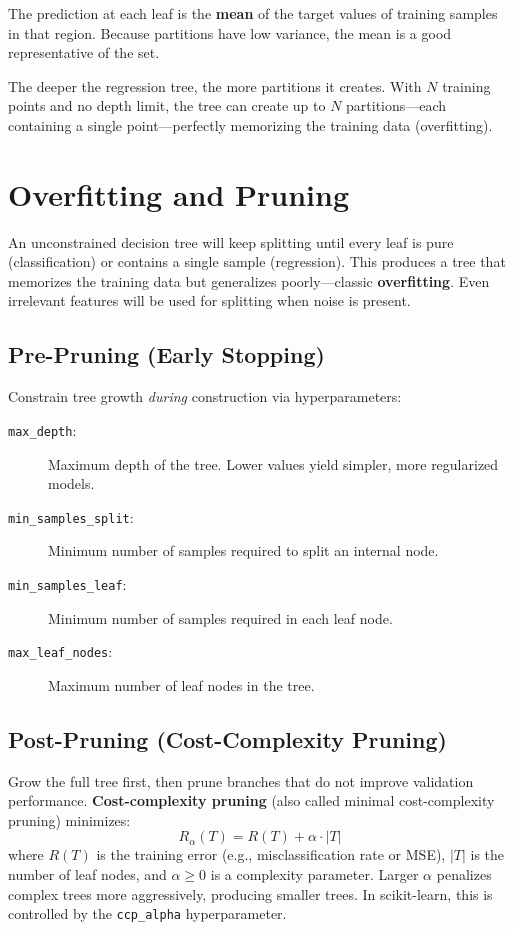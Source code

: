 The prediction at each leaf is the \textbf{mean} of the target values of training samples in that region. Because partitions have low variance, the mean is a good representative of the set.

\begin{remark}
The deeper the regression tree, the more partitions it creates. With $N$ training points and no depth limit, the tree can create up to $N$ partitions---each containing a single point---perfectly memorizing the training data (overfitting).
\end{remark}

\section*{Overfitting and Pruning}

An unconstrained decision tree will keep splitting until every leaf is pure (classification) or contains a single sample (regression). This produces a tree that memorizes the training data but generalizes poorly---classic \textbf{overfitting}. Even irrelevant features will be used for splitting when noise is present.

\subsection*{Pre-Pruning (Early Stopping)}

Constrain tree growth \textit{during} construction via hyperparameters:

\begin{description}
    \item[\texttt{max\_depth}:] Maximum depth of the tree. Lower values yield simpler, more regularized models.
    \item[\texttt{min\_samples\_split}:] Minimum number of samples required to split an internal node.
    \item[\texttt{min\_samples\_leaf}:] Minimum number of samples required in each leaf node.
    \item[\texttt{max\_leaf\_nodes}:] Maximum number of leaf nodes in the tree.
\end{description}

\subsection*{Post-Pruning (Cost-Complexity Pruning)}

Grow the full tree first, then prune branches that do not improve validation performance. \textbf{Cost-complexity pruning} (also called minimal cost-complexity pruning) minimizes:
$$R_\alpha(T) = R(T) + \alpha \cdot |T|$$
where $R(T)$ is the training error (e.g., misclassification rate or MSE), $|T|$ is the number of leaf nodes, and $\alpha \geq 0$ is a complexity parameter. Larger $\alpha$ penalizes complex trees more aggressively, producing smaller trees. In scikit-learn, this is controlled by the \texttt{ccp\_alpha} hyperparameter.

